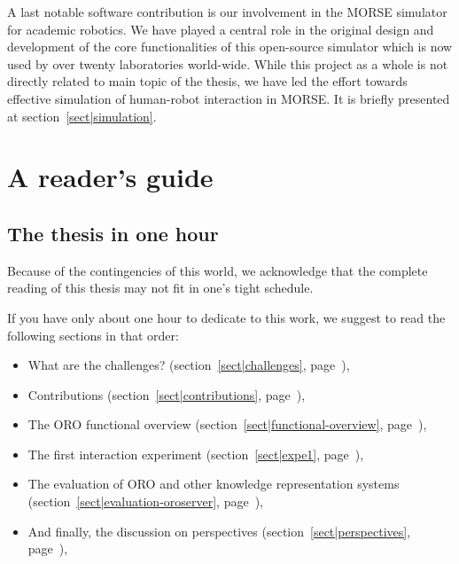 A last notable software contribution is our involvement in the MORSE simulator
for academic robotics. We have played a central role in the original design and
development of the core functionalities of this open-source simulator which is
now used by over twenty laboratories world-wide. While this project as a whole
is not directly related to main topic of the thesis, we have led the effort
towards effective simulation of human-robot interaction in MORSE. It is briefly
presented at section~\ref{sect|simulation}.




\section{A reader's guide}

\subsection*{The thesis in one hour}

Because of the contingencies of this world, we acknowledge that the complete
reading of this thesis may not fit in one's tight schedule.

If you have only about one hour to dedicate to this work, we suggest to read
the following sections in that order:

\begin{itemize} \item What are the challenges? (section~\ref{sect|challenges},
            page~\pageref{sect|challenges}),

    \item Contributions (section~\ref{sect|contributions},
        page~\pageref{sect|contributions}),

    \item The ORO functional overview (section~\ref{sect|functional-overview},
        page~\pageref{sect|functional-overview}),

    \item The first interaction experiment (section~\ref{sect|expe1},
        page~\pageref{sect|expe1}),

    \item The evaluation of ORO and other knowledge representation systems
        (section~\ref{sect|evaluation-oroserver},
        page~\pageref{sect|evaluation-oroserver}),

    \item And finally, the discussion on perspectives
        (section~\ref{sect|perspectives}, page~\pageref{sect|perspectives}),

\end{itemize}

